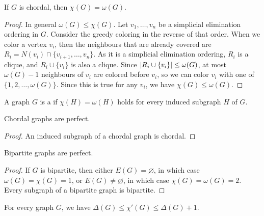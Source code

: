 
\begin{theorem}
  If $G$ is chordal, then $\chi(G) = \omega(G)$.
\end{theorem}

\begin{proof}
  In general $\omega(G) \le \chi(G)$.
  Let $v_1, \ldots, v_n$ be a simplicial elimination ordering in $G$.
  Consider the greedy coloring in the reverse of that order.
  When we color a vertex $v_i$, then the neighbours that are already covered are
  $R_i = N(v_i) \cap \{ v_{i+1}, \ldots, v_n \}$.
  As it is a simplicial elimination ordering, $R_i$ is a clique, and $R_i \cup
  \{v_i\}$ is also a clique.
  Since $\left| R_i \cup \{v_i\} \right| \le \omega(G)$, at most $\omega(G) - 1$
  neighbours of $v_i$ are colored before $v_i$, so we can color $v_i$ with one
  of $\{1, 2, \ldots, \omega(G)\}$.
  Since this is true for any $v_i$, we have $\chi(G) \le \omega(G)$.
\end{proof}


\begin{definition}
  A graph $G$ is a  if $\chi(H) = \omega(H)$ holds for
  every induced subgraph $H$ of $G$.
\end{definition}

\begin{theorem}
  Chordal graphs are perfect.
\end{theorem}

\begin{proof}
  An induced subgraph of a chordal graph is chordal.
\end{proof}


\begin{theorem}
  Bipartite graphs are perfect.
\end{theorem}

\begin{proof}
  If $G$ is bipartite, then either $E(G) = \varnothing$, in which case
  $\omega(G) = \chi(G) = 1$, or $E(G) \ne \varnothing$, in which case $\chi(G) =
  \omega(G) = 2$.
  Every subgraph of a bipartite graph is bipartite.
\end{proof}

\begin{theorem}[Vizing]
  For every graph $G$, we have $\Delta(G) \le \chi'(G) \le \Delta(G)+1$.
\end{theorem}

